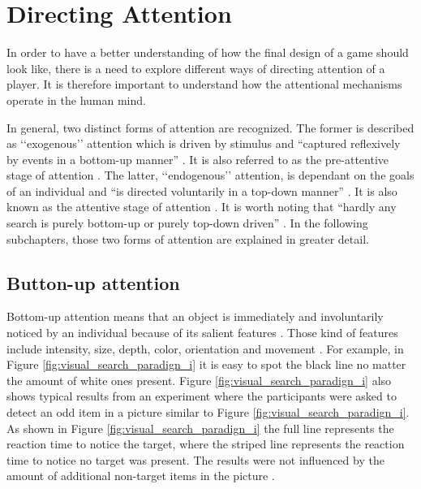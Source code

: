 \section{Directing Attention}\label{sec:direct_attention}
In order to have a better understanding of how the final design of a game should look like, there is a need to explore different ways of directing attention of a player. It is therefore important to understand how the attentional mechanisms operate in the human mind.


In general, two distinct forms of attention are recognized. The former is described as ‘‘exogenous’’ attention which is driven by stimulus and “captured reflexively by events in a bottom-up manner” \cite{lee2011efficient}. It is also referred to as the pre-attentive stage of attention \cite{zhai2008scalable}. The latter, ‘‘endogenous’’ attention, is dependant on the goals of an individual and “is directed voluntarily in a top-down manner” \cite{lee2011efficient}. It is also known as the attentive stage of attention \cite{zhai2008scalable}. It is worth noting that “hardly any search is purely bottom-up or purely top-down driven” \cite{melloni2012interaction}. In the following subchapters, those two forms of attention are explained in greater detail.

\subsection{Button-up attention}\label{subsec:buttonup attention}
Bottom-up attention means that an object is immediately and involuntarily noticed by an individual because of its salient features \cite{melloni2012interaction}. Those kind of features include intensity, size, depth, color, orientation and movement \cite{zhai2008scalable}. For example, in Figure \ref{fig:visual_search_paradign_i} it is easy to spot the black line no matter the amount of white ones present. Figure \ref{fig:visual_search_paradign_i} also shows typical results from an experiment where the participants were asked to detect an odd item in a picture similar to Figure \ref{fig:visual_search_paradign_i}. As shown in Figure \ref{fig:visual_search_paradign_i} the full line represents the reaction time to notice the target, where the striped line represents the reaction time to notice no target was present. The results were not influenced by the amount of additional non-target items in the picture \cite{snowden2012basic}.


